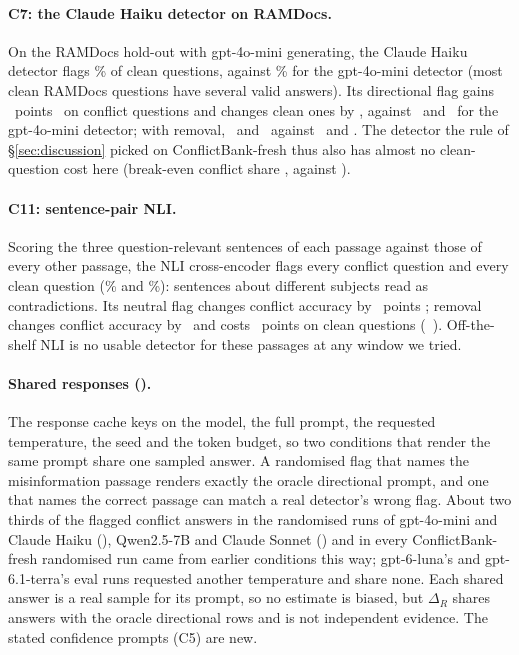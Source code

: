 \paragraph{C7: the Claude Haiku detector on RAMDocs.} On the RAMDocs hold-out with gpt-4o-mini generating, the Claude
Haiku detector flags \cxHdHaikuFlagClean\% of clean questions, against \cxHdMiniFlagClean\% for the gpt-4o-mini
detector (most clean RAMDocs questions have several valid answers). Its directional flag gains \cxHdHaikuDirK\ points
\cxHdHaikuDirKCI\ on conflict questions and changes clean ones by \cxHdHaikuDirC, against \cxHdMiniDirK\ and
\cxHdMiniDirC\ for the gpt-4o-mini detector; with removal, \cxHdHaikuRemK\ and \cxHdHaikuRemC\ against \cxHdMiniRemK\
and \cxHdMiniRemC. The detector the rule of \S\ref{sec:discussion} picked on ConflictBank-fresh thus also has almost
no clean-question cost here (break-even conflict share \cxHdHaikuDirBe, against \cxHdMiniDirBe).

\paragraph{C11: sentence-pair NLI.} Scoring the three question-relevant sentences of each passage against those of
every other passage, the NLI cross-encoder flags every conflict question and every clean question
(\cxNsFlagConf\% and \cxNsFlagClean\%): sentences about different subjects read as contradictions. Its neutral flag
changes conflict accuracy by \cxNsFlagK\ points \cxNsFlagKCI; removal changes conflict accuracy by \cxNsRemK\ and costs
\acxNsRemC\ points on clean questions (\cxNsRemC\ \cxNsRemCCI). Off-the-shelf NLI is no usable detector for these passages at any
window we tried.

\paragraph{Shared responses ().} The response cache keys on the model, the full prompt, the requested
temperature, the seed and the token budget, so two conditions that render the same prompt share one sampled answer.
A randomised flag that names the misinformation passage renders exactly the oracle directional prompt, and one that
names the correct passage can match a real detector's wrong flag. About two thirds of the flagged conflict answers in
the randomised runs of gpt-4o-mini and Claude Haiku (\prs{16}), Qwen2.5-7B and Claude Sonnet (\prs{21}) and in every
ConflictBank-fresh randomised run came from earlier conditions this way; gpt-6-luna's and gpt-6.1-terra's eval runs
requested another temperature and share none. Each shared answer is a real sample for its prompt, so no estimate is
biased, but $\Delta_R$ shares answers with the oracle directional rows and is not independent evidence. The stated
confidence prompts (C5) are new.

